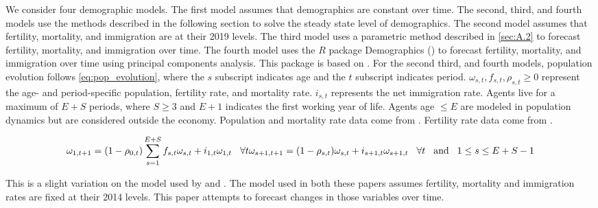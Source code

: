 \documentclass[10pt]{article}
\renewcommand{\thesection}{\arabic{section}}
\renewcommand{\thesubsection}{\thesection.\arabic{subsection}}
\renewcommand{\thesubsubsection}{\thesubsection.\arabic{subsubsection}}
\renewcommand{\subsubsection}[2][]{\oldsubsubsection[#1]{#2}\index{#1}\label{sec:\thesubsubsection}}
\numberwithin{equation}{subsection}
\begin{document}
\begin{appendices}
\subsubsection{Demographics}

\par We consider four demographic models. The first model assumes that demographics are constant over time. The second, third, and fourth models use the methods described in the following section to solve the steady state level of demographics. The second model assumes that fertility, mortality, and immigration are at their 2019 levels. The third model uses a parametric method described in \autoref{sec:A.2} to forecast fertility, mortality, and immigration over time. The fourth model uses the \(R\) package Demographics (\cite{alt_demo}) to forecast fertility, mortality, and immigration over time using principal components analysis. This package is based on \cite{alt_demo_paper}. For the second third, and fourth models, population evolution follows \ref{eq:pop_evolution}, where the \(s\) subscript indicates age and the \(t\) subscript indicates period. \(\omega_{s,t}, f_{s,t}, \rho_{s,t} \geq 0\) represent the age- and period-specific population, fertility rate, and mortality rate. \(i_{s,t}\) represents the net immigration rate. Agents live for a maximum of \(E+S\) periods, where \(S \geq 3\) and \(E + 1\) indicates the first working year of life. Agents age \(\leq E\) are modeled in population dynamics but are considered outside the economy. Population and mortality rate data come from \cite{JMD2018}. Fertility rate data come from \cite{HFC2018}.

\begin{dmath}\label{eq:pop_evolution}
   {\omega_{1,t+1} = (1 - \rho_{0,t})\sum_{s=1}^{E+S}f_{s,t}\omega_{s,t} + i_{1,t}\omega_{1,t} \hspace{3mm} \forall t} \\
   {\omega_{s+1,t+1} = (1 - \rho_{s,t})\omega_{s,t} + i_{s+1,t}\omega_{s+1,t} \hspace{3mm} \forall t \hspace{3mm} \text{and} \hspace{3mm} 1 \leq s \leq E + S - 1}
\end{dmath}

\par This is a slight variation on the model used by \cite{DE2018} and \citet{IO2019}. The model used in both these papers assumes fertility, mortality and immigration rates are fixed at their 2014 levels. This paper attempts to forecast changes in those variables over time.


\end{appendices}
\end{document}
